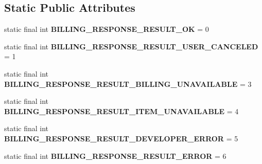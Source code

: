 \subsection*{Static Public Attributes}
\begin{DoxyCompactItemize}
\item 
\mbox{\label{classorg_1_1cocos2dx_1_1plugin_1_1util_1_1IabHelper_a8f176751bb71d24c7bc0ad51f92200bf}} 
static final int {\bfseries B\+I\+L\+L\+I\+N\+G\+\_\+\+R\+E\+S\+P\+O\+N\+S\+E\+\_\+\+R\+E\+S\+U\+L\+T\+\_\+\+OK} = 0
\item 
\mbox{\label{classorg_1_1cocos2dx_1_1plugin_1_1util_1_1IabHelper_ab67c2a40bcf24f3e65a67f5fafa6a4b5}} 
static final int {\bfseries B\+I\+L\+L\+I\+N\+G\+\_\+\+R\+E\+S\+P\+O\+N\+S\+E\+\_\+\+R\+E\+S\+U\+L\+T\+\_\+\+U\+S\+E\+R\+\_\+\+C\+A\+N\+C\+E\+L\+ED} = 1
\item 
\mbox{\label{classorg_1_1cocos2dx_1_1plugin_1_1util_1_1IabHelper_a928d3c235d81ffaacba1b38b6f68fe58}} 
static final int {\bfseries B\+I\+L\+L\+I\+N\+G\+\_\+\+R\+E\+S\+P\+O\+N\+S\+E\+\_\+\+R\+E\+S\+U\+L\+T\+\_\+\+B\+I\+L\+L\+I\+N\+G\+\_\+\+U\+N\+A\+V\+A\+I\+L\+A\+B\+LE} = 3
\item 
\mbox{\label{classorg_1_1cocos2dx_1_1plugin_1_1util_1_1IabHelper_a1b222027fd30ac2cb05e2d2a4ad6fb96}} 
static final int {\bfseries B\+I\+L\+L\+I\+N\+G\+\_\+\+R\+E\+S\+P\+O\+N\+S\+E\+\_\+\+R\+E\+S\+U\+L\+T\+\_\+\+I\+T\+E\+M\+\_\+\+U\+N\+A\+V\+A\+I\+L\+A\+B\+LE} = 4
\item 
\mbox{\label{classorg_1_1cocos2dx_1_1plugin_1_1util_1_1IabHelper_aeb21c03bec64e1fcb596c0a2bd937225}} 
static final int {\bfseries B\+I\+L\+L\+I\+N\+G\+\_\+\+R\+E\+S\+P\+O\+N\+S\+E\+\_\+\+R\+E\+S\+U\+L\+T\+\_\+\+D\+E\+V\+E\+L\+O\+P\+E\+R\+\_\+\+E\+R\+R\+OR} = 5
\item 
\mbox{\label{classorg_1_1cocos2dx_1_1plugin_1_1util_1_1IabHelper_a951885531e0657bc03c350c15f4bc2e0}} 
static final int {\bfseries B\+I\+L\+L\+I\+N\+G\+\_\+\+R\+E\+S\+P\+O\+N\+S\+E\+\_\+\+R\+E\+S\+U\+L\+T\+\_\+\+E\+R\+R\+OR} = 6

\end{DoxyCompactItemize}
